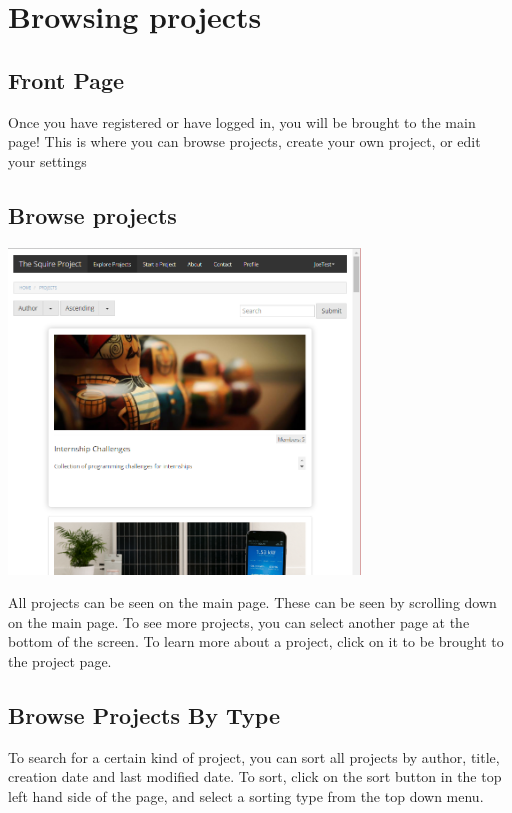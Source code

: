 \documentclass[11pt]{report}
\begin{document}
\chapter{Browsing projects}      
        
\section{Front Page}        	
Once you have registered or have logged in, you will be brought to the main page! This is where you can browse projects, create your own project, or edit your settings

\section{Browse projects}  
	\begin{center}
           \includegraphics[width=0.7\textwidth]{mainpage.png}
    \end{center}
All projects can be seen on the main page. These can be seen by scrolling down on the main page. To see more projects, you can select another page at the bottom of the screen. To learn more about a project, click on it to be brought to the project page.

\section{Browse Projects By Type}  
To search for a certain kind of project, you can sort all projects by author, title, creation date and last modified date. To sort, click on the sort button in the top left hand side of the page, and select a sorting type from the top down menu. 
\end{document}
